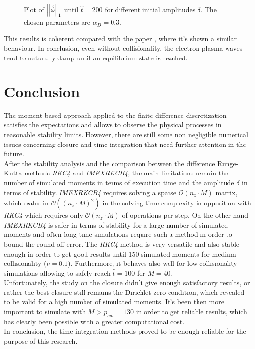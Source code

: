 \documentclass[final]{jpp}
\begin{document}
\begin{figure}
\resizebox{\textwidth}{!}{
    
}
\caption{Plot of $\left\lVert\hat{\phi}\right\rVert_1$ until $\hat{t} = 200$ for different initial amplitudes $\delta$. The chosen parameters are $\alpha_D = 0.3$.}
\label{fig:long-time}
\end{figure}

This results is coherent compared with the paper \cite{thesis5638}, where it's shown a similar behaviour. In conclusion, even without collisionality, the electron plasma waves tend to naturally damp until an equilibrium state is reached.

\section{Conclusion}

The moment-based approach applied to the finite difference discretization satisfies the expectations and allows to observe the physical processes in reasonable stability limits. However, there are still some non negligible numerical issues concerning closure and time integration that need further attention in the future.
\\
After the stability analysis and the comparison between the difference Runge-Kutta methods \textit{RKC4} and \textit{IMEXRKCB4}, the main limitations remain the number of simulated moments in terms of execution time and the amplitude $\delta$ in terms of stability. \textit{IMEXRKCB4} requires solving a sparse $\mathcal{O}(n_z \cdot M)$ matrix, which scales in $\mathcal{O}((n_z \cdot M)^2)$ in the solving time complexity in opposition with \textit{RKC4} which requires only $\mathcal{O}(n_z \cdot M)$ of operations per step. On the other hand \textit{IMEXRKCB4} is safer in terms of stability for a large number of simulated moments and often long time simulations require such a method in order to bound the round-off error.
The \textit{RKC4} method is very versatile and also stable enough in order to get good results until 150 simulated moments for medium collisionality ($\nu = 0.1$). Furthermore, it behaves also well for low collisionality simulations allowing to safely reach $\hat{t} = 100$ for $M = 40$.     
\\
Unfortunately, the study on the closure didn't give enough satisfactory results, or rather the best closure still remains the Dirichlet zero condition, which revealed to be valid for a high number of simulated moments. It's been then more important to simulate with $M > p_{cut} = 130$ in order to get reliable results, which has clearly been possible with a greater computational cost. 
\\
In conclusion, the time integration methods proved to be enough reliable for the purpose of this research. 
\end{document}
